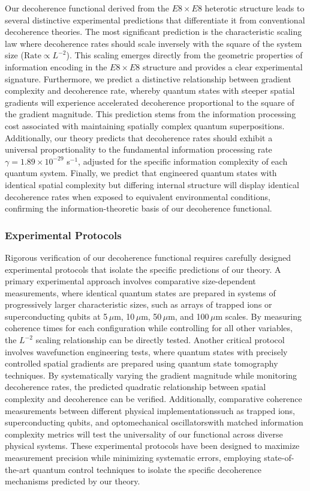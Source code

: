 \documentclass[11pt,english,twoside]{article}
\begin{document}
Our decoherence functional derived from the $E8\times E8$ heterotic structure leads to several distinctive experimental predictions that differentiate it from conventional decoherence theories. The most significant prediction is the characteristic scaling law where decoherence rates should scale inversely with the square of the system size ($\text{Rate} \propto L^{-2}$). This scaling emerges directly from the geometric properties of information encoding in the $E8\times E8$ structure and provides a clear experimental signature. Furthermore, we predict a distinctive relationship between gradient complexity and decoherence rate, whereby quantum states with steeper spatial gradients will experience accelerated decoherence proportional to the square of the gradient magnitude. This prediction stems from the information processing cost associated with maintaining spatially complex quantum superpositions. Additionally, our theory predicts that decoherence rates should exhibit a universal proportionality to the fundamental information processing rate $\gamma = 1.89 \times 10^{-29}$ s$^{-1}$, adjusted for the specific information complexity of each quantum system. Finally, we predict that engineered quantum states with identical spatial complexity but differing internal structure will display identical decoherence rates when exposed to equivalent environmental conditions, confirming the information-theoretic basis of our decoherence functional.

\subsubsection{Experimental Protocols}

Rigorous verification of our decoherence functional requires carefully designed experimental protocols that isolate the specific predictions of our theory. A primary experimental approach involves comparative size-dependent measurements, where identical quantum states are prepared in systems of progressively larger characteristic sizes, such as arrays of trapped ions or superconducting qubits at 5\,$\mu$m, 10\,$\mu$m, 50\,$\mu$m, and 100\,$\mu$m scales. By measuring coherence times for each configuration while controlling for all other variables, the $L^{-2}$ scaling relationship can be directly tested. Another critical protocol involves wavefunction engineering tests, where quantum states with precisely controlled spatial gradients are prepared using quantum state tomography techniques. By systematically varying the gradient magnitude while monitoring decoherence rates, the predicted quadratic relationship between spatial complexity and decoherence can be verified. Additionally, comparative coherence measurements between different physical implementations\textemdash{}such as trapped ions, superconducting qubits, and optomechanical oscillators\textemdash{}with matched information complexity metrics will test the universality of our functional across diverse physical systems. These experimental protocols have been designed to maximize measurement precision while minimizing systematic errors, employing state-of-the-art quantum control techniques to isolate the specific decoherence mechanisms predicted by our theory.
\end{document}
